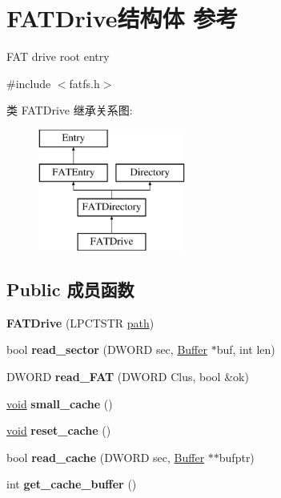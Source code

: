 \hypertarget{struct_f_a_t_drive}{}\section{F\+A\+T\+Drive结构体 参考}
\label{struct_f_a_t_drive}


F\+AT drive root entry  




{\ttfamily \#include $<$fatfs.\+h$>$}

类 F\+A\+T\+Drive 继承关系图\+:\begin{figure}[H]
\begin{center}
\leavevmode
\includegraphics[height=4.000000cm]{struct_f_a_t_drive}
\end{center}
\end{figure}
\subsection*{Public 成员函数}
\begin{DoxyCompactItemize}
\item 
\mbox{\label{struct_f_a_t_drive_a766da43d93a04a6f8ccafc0a8f86e039}} 
{\bfseries F\+A\+T\+Drive} (L\+P\+C\+T\+S\+TR \hyperlink{structpath}{path})
\item 
\mbox{\label{struct_f_a_t_drive_adb22ad32e6d5d26ba4b3d322e88c9876}} 
bool {\bfseries read\+\_\+sector} (D\+W\+O\+RD sec, \hyperlink{class_buffer}{Buffer} $\ast$buf, int len)
\item 
\mbox{\label{struct_f_a_t_drive_ad21eec8fae4ce7f450d0ba1b30e76c5e}} 
D\+W\+O\+RD {\bfseries read\+\_\+\+F\+AT} (D\+W\+O\+RD Clus, bool \&ok)
\item 
\mbox{\label{struct_f_a_t_drive_afa01108fcbacdf38367264a04a23a380}} 
\hyperlink{interfacevoid}{void} {\bfseries small\+\_\+cache} ()
\item 
\mbox{\label{struct_f_a_t_drive_aa3c8cb8f2abd96c529243f7c384fd138}} 
\hyperlink{interfacevoid}{void} {\bfseries reset\+\_\+cache} ()
\item 
\mbox{\label{struct_f_a_t_drive_a5b75ce5eeb306175dfe47b810cb9b782}} 
bool {\bfseries read\+\_\+cache} (D\+W\+O\+RD sec, \hyperlink{class_buffer}{Buffer} $\ast$$\ast$bufptr)
\item 
\mbox{\label{struct_f_a_t_drive_a88bbe476407a4de0ad8f7145d2559755}} 
int {\bfseries get\+\_\+cache\+\_\+buffer} ()
\end{DoxyCompactItemize}
